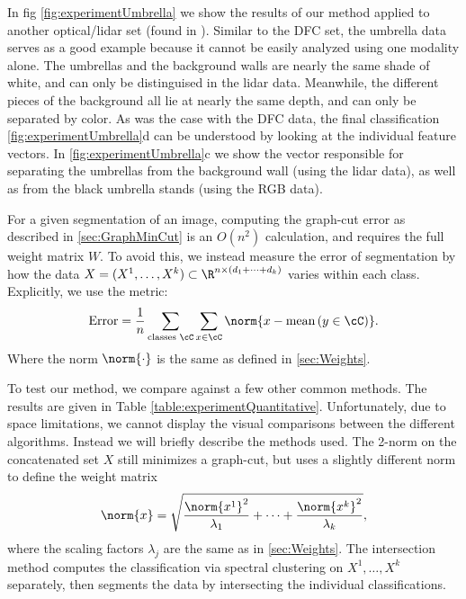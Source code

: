 \documentclass{article}
\begin{document}
In fig \ref{fig:experimentUmbrella} we show the results of our method applied to
another optical/lidar set (found in \cite{Scharstein14}). Similar to the DFC
set, the umbrella data serves as a good example because it cannot be easily
analyzed using one modality alone. The umbrellas and the background walls are
nearly the same shade of white, and can only be distinguised in the lidar
data. Meanwhile, the different pieces of the background all lie at nearly the
same depth, and can only be separated by color. As was the case with the DFC
data, the final classification \ref{fig:experimentUmbrella}d can be understood
by looking at the individual feature vectors. In \ref{fig:experimentUmbrella}c
we show the vector responsible for separating the umbrellas from the background
wall (using the lidar data), as well as from the black umbrella stands (using
the RGB data).

For a given segmentation of an image, computing the graph-cut error as described
in \ref{sec:GraphMinCut} is an $O(n^2)$ calculation, and requires the full
weight matrix $W$. To avoid this, we instead measure the error of segmentation
by how the data $X = (X^1,\ldots,X^k) \subset \R^{n\times (d_1+\cdots+d_k)}$
varies within each class. Explicitly, we use the metric:
\begin{align}
  \text{Error} = \frac{1}{n}\sum_{\text{classes }\cC}\sum_{x\in \cC}\norm{x - \text{mean}\left(y\in \cC\right)}.
\end{align}
%
% 
% 
Where the norm $\norm{\cdot}$ is the same as defined in \ref{sec:Weights}.

To test our method, we compare against a few other common methods. The results
are given in Table \ref{table:experimentQuantitative}. Unfortunately, due to
space limitations, we cannot display the visual comparisons between the
different algorithms. Instead we will briefly describe the methods used. The
2-norm on the concatenated set $X$ still minimizes a graph-cut, but uses a
slightly different norm to define the weight matrix
\begin{align}
  \norm{x} = \sqrt{\frac{\norm{x^1}^2}{\lambda_1} + \cdots +
  \frac{\norm{x^k}^2}{\lambda_k}},
\end{align}
where the scaling factors $\lambda_j$ are the same as in \ref{sec:Weights}.  The
intersection method computes the classification via spectral clustering on
$X^1, \ldots, X^k$ separately, then segments the data by intersecting the
individual classifications.
\end{document}
